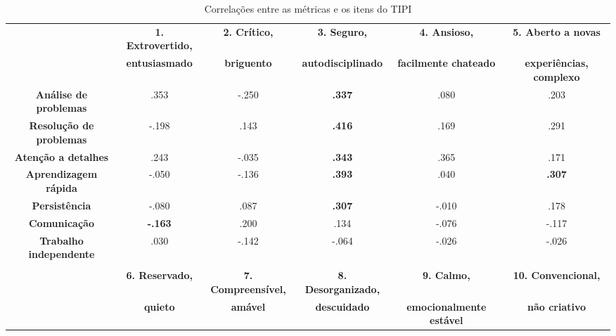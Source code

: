 \begin{sidewaystable}[ph!]
\footnotesize
\caption{\small Correlações entre as métricas e os itens do TIPI}
\renewcommand{\arraystretch}{1.4} 
\centering
\begin{tabular}{lccccc}

    \toprule		
		& \textbf{1. Extrovertido, }  & \textbf{2. Crítico, } & \textbf{3. Seguro, } 			 & \textbf{4. Ansioso, } 				& \textbf{5. Aberto a novas } \\
		& \textbf{entusiasmado} 			& \textbf{briguento} 		& \textbf{autodisciplinado} & \textbf{facilmente chateado} & \textbf{experiências, complexo} \\
					
    \midrule
    \multicolumn{1}{c}{\textbf{Análise de problemas}} 		& .353  				 & -.250 & \textbf{.337} & .080  & .203 				 \\
    \multicolumn{1}{c}{\textbf{Resolução de problemas}}		& -.198  				 & .143  & \textbf{.416} & .169  & .291 				 \\
    \multicolumn{1}{c}{\textbf{Atenção a detalhes}} 			& .243  				 & -.035 & \textbf{.343} & .365  & .171 				 \\
    \multicolumn{1}{c}{\textbf{Aprendizagem rápida}} 			& -.050  				 & -.136 & \textbf{.393} & .040  & \textbf{.307} \\
    \multicolumn{1}{c}{\textbf{Persistência}} 						& -.080  				 & .087  & \textbf{.307} & -.010 & .178 				 \\
    \multicolumn{1}{c}{\textbf{Comunicação}} 							& \textbf{-.163} & .200  & .134  			   & -.076 & -.117 				 \\
    \multicolumn{1}{c}{\textbf{Trabalho independente}} 		& .030  				 & -.142 & -.064 				 & -.026 & -.026 				 \\ 
		
    \multicolumn{1}{c}{\textbf{}} & & & & &  \\
		
    \toprule
		& \textbf{6. Reservado, } & \textbf{7. Compreensível, } & \textbf{8. Desorganizado, } & \textbf{9. Calmo, } 						& \textbf{10. Convencional, } \\
		& \textbf{quieto} 				& \textbf{amável} 						& \textbf{descuidado}					& \textbf{emocionalmente estável} & \textbf{não criativo} \\ 
		

\end{tabular}
\end{sidewaystable}

